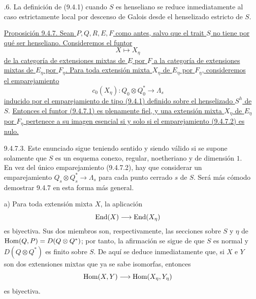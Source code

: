 \medskip
{}.6. La definición de (9.4.1) cuando $S$ es henseliano se reduce
inmediatamente al caso estrictamente local por descenso de Galois desde
el henselizado estricto de $S$.

\medskip
\noindent
\underline{Proposición 9.4.7. Sean $P,Q,R,E,F$ como antes, salvo que el
trait $S$ no tiene por qué ser henseliano. Consideremos el funtor}
\begin{equation}\tag{9.4.7.1}
 X\longmapsto X_\eta
\end{equation}
\underline{de la categoría de extensiones mixtas de $E$ por $F$ a la
categoría de extensiones mixtas de $E_\eta$ por $F_\eta$. Para toda
extensión mixta $X_\eta$ de $E_\eta$ por $F_\eta$, consideremos el
emparejamiento}
\begin{equation}\tag{9.4.7.2}
 c_0(X_\eta):Q_0\otimes Q_0^*\longrightarrow\Lambda_s
\end{equation}
\underline{inducido por el emparejamiento de tipo (9.4.1) definido
sobre el henselizado $S^h$ de} $S$. \underline{Entonces el funtor (9.4.7.1) es
plenamente fiel, y una extensión mixta $X_\eta$ de $E_\eta$ por
$F_\eta$ pertenece a su imagen esencial si y solo si el emparejamiento
(9.4.7.2) es nulo.}


9.4.7.3. Este enunciado sigue teniendo sentido y siendo válido si se
supone solamente que $S$ es un esquema conexo, regular, noetheriano y de
dimensión $1$. En vez del único emparejamiento (9.4.7.2), hay que
considerar un emparejamiento
$Q_s\otimes Q_s^*\longrightarrow\Lambda_s$ para cada punto cerrado $s$
de $S$. Será más cómodo demostrar 9.4.7 en esta forma más general.

\smallskip
\noindent
a) Para toda extensión mixta $X$, la aplicación
\begin{equation*}
 \End(X)\longrightarrow\End(X_\eta)
\end{equation*}
es biyectiva. Sus dos miembros son, respectivamente, las secciones sobre
$S$ y $\eta$ de
$\underline{\Hom}(\sisi{P,Q}{Q,P})=D(Q\otimes Q^*)$; por tanto, la
afirmación se sigue de que $S$ es normal y $D(Q\otimes Q^*)$ es finito
sobre $S$. De aquí se deduce inmediatamente que, si $X$ e $Y$ son dos
extensiones mixtas que ya se sabe isomorfas, entonces
\begin{equation*}
 \Hom(X,Y)\longrightarrow\Hom(X_\eta,Y_\eta)
\end{equation*}
es biyectiva.

